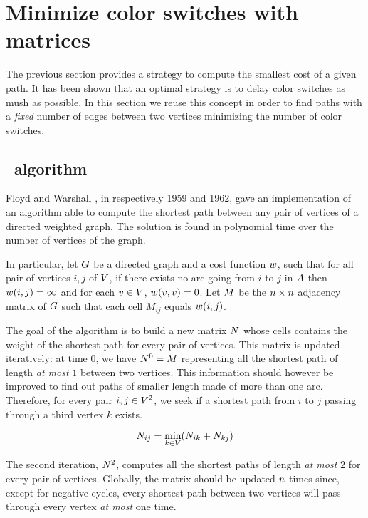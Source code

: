 \section{Minimize color switches with matrices}

The previous section provides a strategy to compute the smallest cost of a given path. It has been shown that an optimal strategy is to delay color switches as mush as possible. In this section we reuse this concept in order to find paths with a \textit{fixed} number of edges between two vertices minimizing the number of color switches.

\subsection{\FW\ algorithm}
\label{sec:fwalgo}

Floyd \cite[]{floyd} and Warshall \cite{warshall}, in respectively 1959 and 1962, gave an implementation \cite[]{floydalgo} of an algorithm able to compute the shortest path between any pair of vertices of a directed weighted graph. The solution is found in polynomial time over the number of vertices of the graph.

In particular, let $G$ be a directed graph and a cost function $w$, such that for all pair of vertices $i,j$ of $V$, if there exists no arc going from $i$ to $j$ in $A$ then $w(i,j) = \infty$ and for each $v \in V$, $w(v, v) = 0$. Let $M$ be the $n \times n$ adjacency matrix of $G$ such that each cell $M_{ij}$ equals $w(i, j)$.

The goal of the algorithm is to build a new matrix $N$ whose cells contains the weight of the shortest path for every pair of vertices. This matrix is updated iteratively: at time $0$, we have $N^0 = M$ representing all the shortest path of length \textit{at most} $1$ between two vertices. This information should however be improved to find out paths of smaller length made of more than one arc. Therefore, for every pair $i, j \in V^2$, we seek if a shortest path from $i$ to $j$ passing through a third vertex $k$ exists.

\begin{equation}
  \label{eq:cellc}
  N_{ij} = \min_{k \in V} (N_{ik} + N_{kj})
\end{equation}

The second iteration, $N^2$, computes all the shortest paths of length \textit{at most} $2$ for every pair of vertices. Globally, the matrix should be updated $n$ times since, except for negative cycles, every shortest path between two vertices will pass through every vertex \textit{at most} one time.

